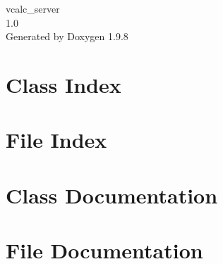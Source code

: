 \documentclass[twoside]{book}
\newcommand{\+}{\discretionary{\mbox{\scriptsize$\hookleftarrow$}}{}{}}
\newcommand{\clearemptydoublepage}{%
    \newpage{\pagestyle{empty}\cleardoublepage}%
  }
\begin{document}
  \raggedbottom
    \hypersetup{pageanchor=false,
                bookmarksnumbered=true,
                pdfencoding=unicode
               }
  \begin{titlepage}
  \vspace*{7cm}
  \begin{center}%
  {\Large vcalc\+\_\+server}\\
  [1ex]\large 1.\+0 \\
  \vspace*{1cm}
  {\large Generated by Doxygen 1.9.8}\\
  \end{center}
  \end{titlepage}
  \clearemptydoublepage
  \tableofcontents
  \clearemptydoublepage
  \hypersetup{pageanchor=true}

\chapter{Class Index}

\chapter{File Index}

\chapter{Class Documentation}




\chapter{File Documentation}









  \backmatter
  \newpage
  \clearemptydoublepage
  \printindex
\end{document}
